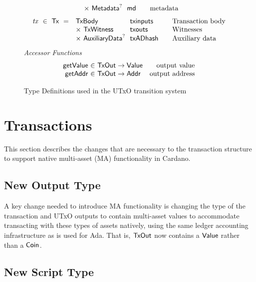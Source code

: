 \begin{figure*}[t!]
\begin{equation*}
\begin{array}{r@{~~}l@{~~}l@{\qquad}l}
      & \times ~\Metadata^? & \fun{md} & \text{metadata}
    \end{array}
  \end{equation*}
  \begin{equation*}
    \begin{array}{r@{~~}l@{~~}l@{\qquad}l}
      \var{tx} ~\in~ \Tx ~=~
      & \TxBody & \fun{txinputs}& \text{Transaction body}\\
      &\times ~\TxWitness & \fun{txouts}& \text{Witnesses}\\
      & \times ~\AuxiliaryData^? & \fun{txADhash} & \text{Auxiliary data}
    \end{array}
  \end{equation*}
  \emph{Accessor Functions}
  \begin{equation*}
    \begin{array}{r@{~\in~}lr}
      \fun{getValue} & \TxOut \to \Value & \text{output value} \\
      \fun{getAddr} & \TxOut \to \Addr & \text{output address}
    \end{array}
  \end{equation*}
  \caption{Type Definitions used in the UTxO transition system}
  \label{fig:defs:utxo-shelley}
\end{figure*}

\section{Transactions}
\label{sec:transactions}

This section describes the changes that are necessary to the
transaction structure to support native multi-asset (MA) functionality in
Cardano.

\subsection*{New Output Type}

A key change needed to introduce MA functionality is changing the type of
the transaction and UTxO outputs to contain multi-asset values to accommodate
transacting with these types of assets natively, using the same ledger accounting
infrastructure as is used for Ada. That is,
$\mathsf{TxOut}$ now contains a $\mathsf{Value}$ rather than a $\mathsf{Coin}$.

\subsection*{New Script Type}

